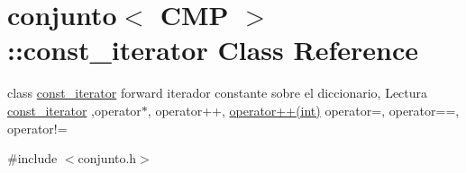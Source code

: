 \hypertarget{classconjunto_1_1const__iterator}{\section{conjunto$<$ C\-M\-P $>$\-:\-:const\-\_\-iterator Class Reference}
\label{classconjunto_1_1const__iterator}
}


class \hyperlink{classconjunto_1_1const__iterator}{const\-\_\-iterator} forward iterador constante sobre el diccionario, Lectura \hyperlink{classconjunto_1_1const__iterator}{const\-\_\-iterator} ,operator$\ast$, operator++, \hyperlink{classconjunto_1_1const__iterator_a9ab281204402103f6d674986eb63f80d}{operator++(int)} operator=, operator==, operator!=  




{\ttfamily \#include $<$conjunto.\-h$>$}

